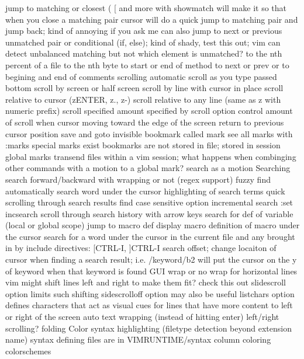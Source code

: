 \documentclass[12pt]{book}
\begin{document}
      jump to matching or closest ( { [ and more with %
        showmatch will make it so that when you close a matching pair cursor will do a quick jump to matching pair and jump back; kind of annoying if you ask me
        can also jump to next or previous unmatched pair or conditional (if, else); kind of shady, test this out; vim can detect unbalanced matching but not which element is unmatched?
      to the nth percent of a file
      to the nth byte
      to start or end of method
      to next or prev { or }
      to begining and end of comments
    scrolling
      automatic scroll as you type passed bottom
      scroll by screen or half screen
      scroll by line with cursor in place
      scroll relative to cursor (zENTER, z., z-)
      scroll relative to any line (same as z with numeric prefix)
      scroll specified amount specified by scroll option
      control amount of scroll when cursor moving toward the edge of the screen
    return to previous cursor position
    save and goto invisible bookmark called mark
      see all marks with :marks
      special marks exist
      bookmarks are not stored in file; stored in session
      global marks transend files within a vim session; what happens when combinging other commands with a motion to a global mark?
    search as a motion
Searching
  search forward/backward with wrapping or not (regex support)
  fuzzy find
  automatically search word under the cursor
  highlighting of search terms
  quick scrolling through search results
  find
  case sensitive option
  incremental search :set incsearch
  scroll through search history with arrow keys
  search for def of variable (local or global scope)
  jump to macro def
  display macro definition of macro under the cursor
  search for a word under the cursor in the current file and any brought in by include directives: [CTRL-I, ]CTRL-I
  search offset; change locaiton of cursor when finding a search result; i.e. /keyword/b2 will put the cursor on the y of keyword when that keyword is found
GUI
  wrap or no wrap for horizontal lines
    vim might shift lines left and right to make them fit? check this out
    slidescroll option limits such shifting
    sidescrolloff option may also be useful
    listchars option defines characters that act as visual cues for lines that have more content to left or right of the screen
    auto text wrapping (instead of hitting enter)
  left/right scrolling?
  folding
  Color
    syntax highlighting (filetype detection beyond extension name)
      syntax defining files are in VIMRUNTIME/syntax
    column coloring
    colorschemes
}
\end{document}

